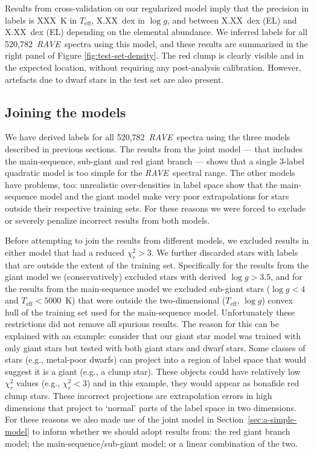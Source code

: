 \documentclass[preprint,trackchanges]{aastex}
\newcommand{\acronym}[1]{{\small{#1}}}
\newcommand{\project}[1]{\textsl{#1}}
\newcommand{\rave}{\project{\acronym{RAVE}}}
\newcommand{\teff}{T_{\mathrm{eff}}}
\newcommand{\logg}{\log g}
\newcommand{\Nspectra}{520,782}
\begin{document}
Results from cross-validation on our regularized model imply that the precision
in labels is XXX~K in $\teff$, X.XX~dex in $\logg$, and between X.XX~dex (EL) and 
X.XX~dex (EL) depending on the elemental abundance.  We inferred labels for all
\Nspectra\ \rave\ spectra using this model, and these results are summarized in
the right panel of Figure \ref{fig:test-set-density}.  The red clump is clearly visible
and in the expected location, without requiring any post-analysis calibration.
However, artefacts due to dwarf stars in the test set are also present.


\subsection{Joining the models}
\label{sec:joining-the-models}

We have derived labels for all \Nspectra\ \rave\ spectra using the three models
described in previous sections.  The results from the joint model --- that includes 
the main-sequence, sub-giant and red giant branch --- shows that a single 3-label quadratic
model is too simple for the \rave\ spectral range.  The other models have problems,
too: unrealistic over-densities in label space show that the main-sequence model and
the giant model make very poor extrapolations for stars outside their respective
training sets.  For these reasons we were forced to exclude or severely penalize 
incorrect results from both models.


Before attempting to join the results from different models, we excluded results
in either model that had a reduced $\chi_{r}^2 > 3$.  We further discarded stars with
labels that are outside the extent of the training set.  Specifically for the
results from the giant model we (conservatively) excluded stars with derived 
$\logg > 3.5$, and for the results from the main-sequence model we excluded 
sub-giant stars ($\logg < 4$ and $\teff < 5000$~K) that were outside the 
two-dimensional ($\teff$, $\logg$) convex hull of the training set used for the main-sequence model.  Unfortunately these restrictions did not remove all spurious
results.  The reason for this can be explained with an example:  consider that our 
giant star model was trained with only giant stars but tested with both giant 
stars and dwarf stars.  Some classes of stars (e.g., metal-poor dwarfs) can 
project into a region of label space that would suggest it is a giant 
(e.g., a clump star).  These objects could have relatively low $\chi_{r}^2$ values
(e.g., $\chi_{r}^2 < 3$) and in this example, they would appear as bonafide red clump 
stars.  These incorrect projections are extrapolation errors in high dimensions that
project to `normal' parts of the label space in two dimensions.  For these reasons 
we also made use of the joint model in Section~\ref{sec:a-simple-model}
to inform whether we should adopt results from: the red giant branch model; the
main-sequence/sub-giant model; or a linear combination of the two. 
\end{document}
